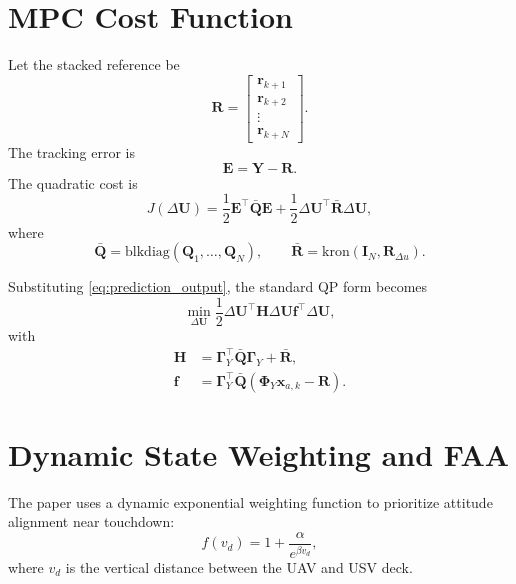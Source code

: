 \documentclass[12pt,a4paper]{article}
\begin{document}
\section{MPC Cost Function}

Let the stacked reference be
\begin{equation}
\bm{R}=
\begin{bmatrix}
\bm{r}_{k+1}\\
\bm{r}_{k+2}\\
\vdots\\
\bm{r}_{k+N}
\end{bmatrix}.
\end{equation}
The tracking error is
\begin{equation}
\bm{E}=\bm{Y}-\bm{R}.
\end{equation}
The quadratic cost is
\begin{equation}
J(\Delta\bm{U})
=
\frac{1}{2}\bm{E}^{\top}\bar{\bm{Q}}\bm{E}
+
\frac{1}{2}\Delta\bm{U}^{\top}\bar{\bm{R}}\Delta\bm{U},
\end{equation}
where
\begin{equation}
\bar{\bm{Q}}=\mathrm{blkdiag}(\bm{Q}_1,\ldots,\bm{Q}_N),\qquad
\bar{\bm{R}}=\mathrm{kron}(\bm{I}_{N},\bm{R}_{\Delta u}).
\end{equation}

Substituting \eqref{eq:prediction_output}, the standard QP form becomes
\begin{equation}
\min_{\Delta\bm{U}}
\frac{1}{2}\Delta\bm{U}^{\top}\bm{H}\Delta\bm{U}
\bm{f}^{\top}\Delta\bm{U},
\end{equation}
with
\begin{align}
\bm{H} &= \bm{\Gamma}_Y^{\top}\bar{\bm{Q}}\bm{\Gamma}_Y+\bar{\bm{R}},\\
\bm{f} &= \bm{\Gamma}_Y^{\top}\bar{\bm{Q}}
\left(\bm{\Phi}_Y\bm{x}_{a,k}-\bm{R}\right).
\end{align}

\section{Dynamic State Weighting and FAA}

The paper uses a dynamic exponential weighting function to prioritize attitude alignment near touchdown:
\begin{equation}
f(v_d)=1+\frac{\alpha}{e^{\beta v_d}},
\label{eq:faa}
\end{equation}
where $v_d$ is the vertical distance between the UAV and USV deck.
\end{document}
